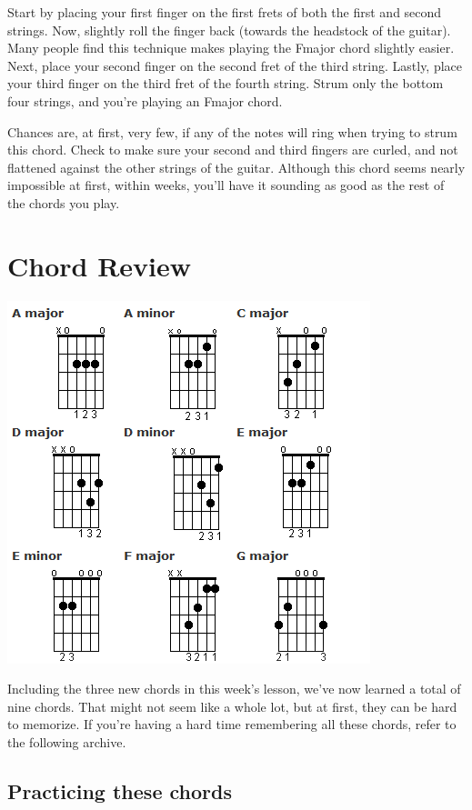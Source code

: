 Start by placing your first finger on the first frets of both the first and
second strings. Now, slightly roll the finger back (towards the headstock of
the guitar). Many people find this technique makes playing the Fmajor chord
slightly easier. Next, place your second finger on the second fret of the third
string. Lastly, place your third finger on the third fret of the fourth string.
Strum only the bottom four strings, and you're playing an Fmajor chord.

Chances are, at first, very few, if any of the notes will ring when trying to
strum this chord. Check to make sure your second and third fingers are curled,
and not flattened against the other strings of the guitar. Although this chord
seems nearly impossible at first, within weeks, you'll have it sounding as good
as the rest of the chords you play.

\section{Chord Review}
\includegraphics{partthree/lesson-three-chord-chart.png}

Including the three new chords in this week's lesson, we've now learned a total
of nine chords. That might not seem like a whole lot, but at first, they can be
hard to memorize. If you're having a hard time remembering all these chords,
refer to the following archive.

\subsection{Practicing these chords}

